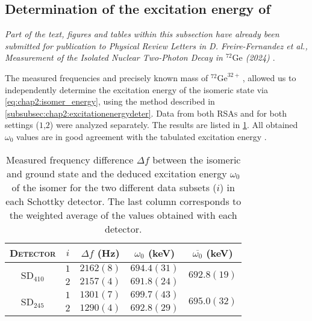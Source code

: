   \subsection{Determination of the excitation energy of \,}\label{subsec:chap3:72gemeasurementenergy}
  \textit{\footnotesize Part of the text, figures and tables within this subsection have already been submitted for publication to Physical Review Letters in D. Freire-Fernandez et al., Measurement of the Isolated Nuclear Two-Photon Decay in $^{72}\mathrm{Ge}$ (2024) \cite{freirefernández2023measurement}}.

  The measured frequencies and precisely known mass of $^{72}\mathrm{Ge}^{32+}$\,\cite{AME-2020}, allowed us to independently determine the excitation energy of the isomeric state via \cref{eq:chap2:isomer_energy}, using the method described in \cref{subsubsec:chap2:excitationenergydeter}.
  Data from both \textsc{RSAs} and for both settings ($1$,$2$) were analyzed separately.
  The results are listed in \cref{tab:chap3:isomer_energy}.
  All obtained $\omega_0$ values are in good agreement with the tabulated excitation energy \cite{ENSDF}.
  
  \begin{table}[hbt]
    \caption{Measured frequency difference $\Delta f$ between the isomeric and ground state and the deduced excitation energy $\omega_0$ of the isomer for the two different data subsets ($i$) in each Schottky detector. The last column corresponds to the weighted average of the values obtained with each detector.}
    \label{tab:chap3:isomer_energy}
    \centering
    \begin{tabular}{ccccc} 
      \toprule 
      \toprule
      \textsc{Detector} & $i$ & $\Delta f$ (Hz) & $\omega_0$ (keV) & \multicolumn{1}{c}{$\overline{\omega_{0}}$ (keV)}\\
      \midrule\midrule
      \multirow{2}{*}{\textsc{SD}$_{410}$} & $1$ & $2162\left(8\right)$ & $694.4\left(31\right)$ & \multirow{2}{*}{$692.8\left(19\right)$} \\ \cline{2-4}
      & $2$ & $2157\left(4\right)$ & $691.8\left(24\right)$ & \\
      \multirow{2}{*}{\textsc{SD}$_{245}$} & $1$ & $1301\left(7\right)$ & $699.7\left(43\right)$ & \multirow{2}{*}{$695.0\left(32\right)$} \\ \cline{2-4}
      & $2$ & $1290\left(4\right)$ & $692.8\left(29\right)$ & \\
      \bottomrule
      \bottomrule
    \end{tabular}
    
  \end{table}


